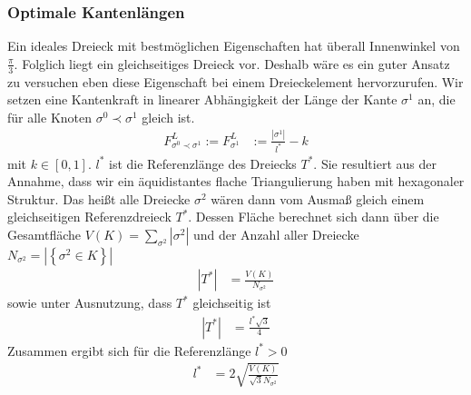   \subsubsection{Optimale Kantenlängen}
    Ein ideales Dreieck mit bestmöglichen Eigenschaften hat überall Innenwinkel von \( \frac{\pi}{3} \). 
    Folglich liegt ein gleichseitiges Dreieck vor. 
    Deshalb wäre es ein guter Ansatz zu versuchen eben diese Eigenschaft bei einem Dreieckelement hervorzurufen.
    Wir setzen eine Kantenkraft in linearer Abhängigkeit der Länge der Kante \( \sigma^{1} \) an, die für alle Knoten \( \sigma^{0}\prec\sigma^{1} \) gleich ist.
    \begin{align}
       F^{L}_{\sigma^{0}\prec\sigma^{1}} := F^{L}_{\sigma^{1}} &:= \frac{|\sigma^{1}|}{l^{*}} - k
       \label{edgeForce}
    \end{align}
    mit \( k \in [0,1] \). 
    \( l^{*} \) ist die Referenzlänge des Dreiecks \( T^{*} \). Sie resultiert aus der Annahme, dass wir ein äquidistantes flache Triangulierung haben mit hexagonaler Struktur.
    Das heißt alle Dreiecke \( \sigma^{2}\) wären dann vom Ausmaß gleich einem gleichseitigen Referenzdreieck \( T^{*} \).
    Dessen Fläche berechnet sich dann über die Gesamtfläche \( V(K) = \sum_{\sigma^{2}}|\sigma^{2}| \) und der Anzahl aller Dreiecke \( N_{\sigma^{2}} = |\left\{ \sigma^{2} \in K \right\}|\)
    \begin{align}
        |T^{*}| &= \frac{V(K)}{N_{\sigma^{2}}}
    \end{align}
    sowie unter Ausnutzung, dass \( T^{*} \) gleichseitig ist
    \begin{align}
      |T^{*}| &= \frac{l^{*}\sqrt{3}}{4}
    \end{align}
    Zusammen ergibt sich für die Referenzlänge \( l^{*} > 0 \)
    \begin{align}
      l^{*} &= 2 \sqrt{\frac{V(K)}{\sqrt{3}N_{\sigma^{2}}}}
    \end{align}

